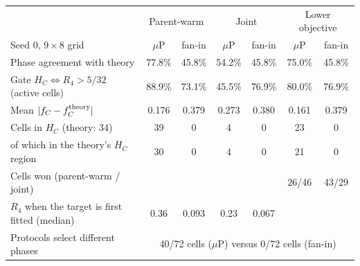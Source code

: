 \documentclass[10pt]{article}
\begin{document}
\begin{center}
\small\setlength{\tabcolsep}{4pt}
\begin{tabular}{@{}lcccccc@{}}
\toprule
 & \multicolumn{2}{c}{Parent-warm} & \multicolumn{2}{c}{Joint} & \multicolumn{2}{c}{Lower objective} \\
Seed 0, $9\times8$ grid & $\mu$P & fan-in & $\mu$P & fan-in & $\mu$P & fan-in \\
\midrule
Phase agreement with theory & 77.8\% & 45.8\% & 54.2\% & 45.8\% & 75.0\% & 45.8\% \\
Gate $H_C\Leftrightarrow R_4>5/32$ (active cells) & 88.9\% & 73.1\% & 45.5\% & 76.9\% & 80.0\% & 76.9\% \\
Mean $|f_C-f_C^{\rm theory}|$ & 0.176 & 0.379 & 0.273 & 0.380 & 0.161 & 0.379 \\
Cells in $H_C$ (theory: 34) & 39 & 0 & 4 & 0 & 23 & 0 \\
\quad of which in the theory's $H_C$ region & 30 & 0 & 4 & 0 & 21 & 0 \\
Cells won (parent-warm / joint) & & & & & 26/46 & 43/29 \\
$R_4$ when the target is first fitted (median) & 0.36 & 0.093 & 0.23 & 0.067 & & \\
\midrule
Protocols select different phases & \multicolumn{6}{c}{40/72 cells ($\mu$P) versus 0/72 cells
(fan-in)} \\
\bottomrule
\end{tabular}
\end{center}
\end{document}
